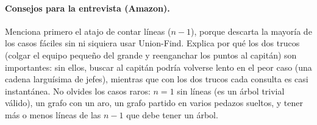 \paragraph{Consejos para la entrevista (Amazon).} Menciona primero el atajo de
contar líneas ($n-1$), porque descarta la mayoría de los casos fáciles sin ni
siquiera usar Union-Find. Explica por qué los dos trucos (colgar el equipo
pequeño del grande y reenganchar los puntos al capitán) son importantes: sin
ellos, buscar al capitán podría volverse lento en el peor caso (una cadena
larguísima de jefes), mientras que con los dos trucos cada consulta es casi
instantánea. No olvides los casos raros: $n=1$ sin líneas (es un árbol trivial
válido), un grafo con un aro, un grafo partido en varios pedazos sueltos, y
tener más o menos líneas de las $n-1$ que debe tener un árbol.
